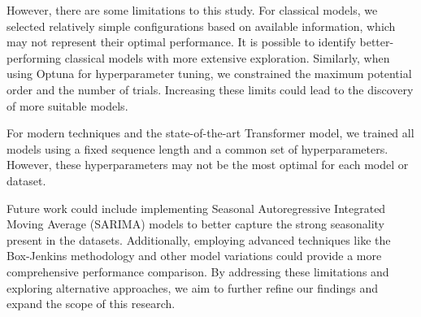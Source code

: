 \documentclass{scrartcl}
\begin{document}
However, there are some limitations to this study. For classical models, we selected relatively simple configurations based on available information, which may not represent their optimal performance. It is possible to identify better-performing classical models with more extensive exploration. Similarly, when using Optuna for hyperparameter tuning, we constrained the maximum potential order and the number of trials. Increasing these limits could lead to the discovery of more suitable models.

For modern techniques and the state-of-the-art Transformer model, we trained all models using a fixed sequence length and a common set of hyperparameters. However, these hyperparameters may not be the most optimal for each model or dataset.

Future work could include implementing Seasonal Autoregressive Integrated Moving Average (SARIMA) \cite{box2015time} models to better capture the strong seasonality present in the datasets. Additionally, employing advanced techniques like the Box-Jenkins \cite{box2015time} methodology and other model variations could provide a more comprehensive performance comparison. By addressing these limitations and exploring alternative approaches, we aim to further refine our findings and expand the scope of this research.






\end{document}

